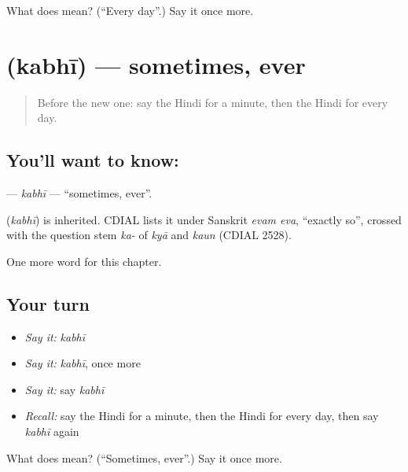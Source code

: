 \begin{tcolorbox}[breakable,colback=teal!4,colframe=teal!35!black,title={Before you move on}]
What does  mean? (\textquotedblleft{}Every day\textquotedblright{}.) Say it once more.
\end{tcolorbox}
\section[\texorpdfstring{\hi{कभी} (kabhī)}{कभी (kabhī)}]{ (kabhī) — sometimes, ever}

\label{lesson:HI-C192-kabhi}



\begin{quote}
Before the new one: say the Hindi for a minute, then the Hindi for every day.
\end{quote}

\subsection*{You'll want to know: }
\textbf{} — \emph{kabhī} — \textquotedblleft{}sometimes, ever\textquotedblright{}.

\begin{cousinweb}
\textbf{} (\emph{kabhī}) is inherited. CDIAL lists it under Sanskrit \emph{evam eva}, \textquotedblleft{}exactly so\textquotedblright{}, crossed with the question stem \emph{ka-} of \emph{kyā} and \emph{kaun} (CDIAL 2528).
\end{cousinweb}

\begin{grammarlens}[title={What you've built}]
One more word for this chapter.
\end{grammarlens}

\subsection*{Your turn}
\begin{itemize}
\raggedright
  \item \emph{Say it:} \emph{kabhī}
  \item \emph{Say it:} \emph{kabhī}, once more
  \item \emph{Say it:} say \emph{kabhī}
  \item \emph{Recall:} say the Hindi for a minute, then the Hindi for every day, then say \emph{kabhī} again
\end{itemize}

\begin{tcolorbox}[breakable,colback=teal!4,colframe=teal!35!black,title={Before you move on}]
What does  mean? (\textquotedblleft{}Sometimes, ever\textquotedblright{}.) Say it once more.
\end{tcolorbox}
